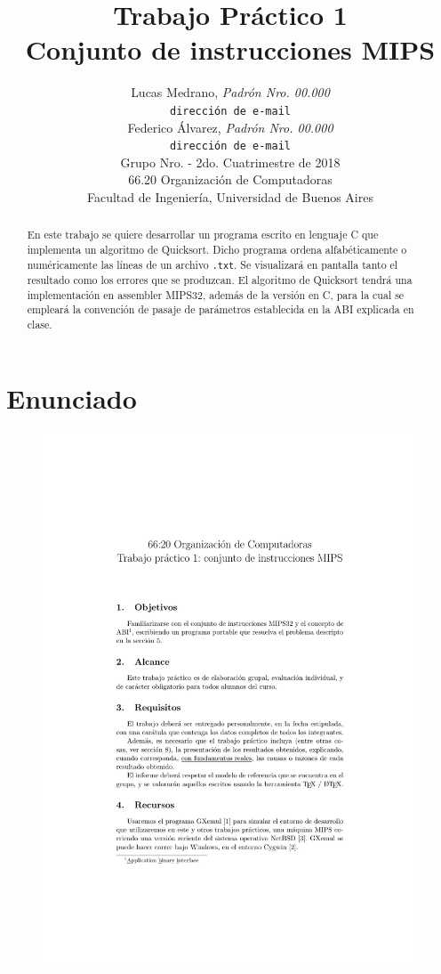 \documentclass[a4paper, 12pt]{article}
\title{		\textbf{Trabajo Práctico 1}\\
			\textbf{Conjunto de instrucciones MIPS}
			}
\author{	Lucas Medrano, \textit{Padrón Nro. 00.000}                     	\\
            \texttt{ dirección de e-mail }                           		\\
            Federico Álvarez, \textit{Padrón Nro. 00.000}                 	\\
            \texttt{ dirección de e-mail }                                 	\\[2.5ex]
            \normalsize{Grupo Nro. \quad - 2do. Cuatrimestre de 2018}      	\\
            \normalsize{66.20 Organización de Computadoras}               	\\
            \normalsize{Facultad de Ingeniería, Universidad de Buenos Aires}\\
       }
\date{}
\begin{document}
	\lstset{inputencoding=utf8/latin1} %
	\maketitle
	\thispagestyle{empty}
	\begin{abstract}
		En este trabajo se quiere desarrollar un programa escrito en lenguaje C que implementa un algoritmo de Quicksort. Dicho programa ordena alfabéticamente o numéricamente las líneas de un archivo \texttt{.txt}. Se visualizará en pantalla tanto el resultado como los errores que se produzcan. El algoritmo de Quicksort tendrá una implementación en assembler MIPS32, además de la versión en C, para la cual se empleará la convención de pasaje de parámetros establecida en la ABI explicada en clase.
	\end{abstract}
	
	\pagebreak
	\thispagestyle{empty}
	\tableofcontents
	\newpage
	
	\setcounter{page}{1}
	
	\section{Enunciado}
	\begin{figure}[H]
		\centering
		\includegraphics[scale=1, page = 1, clip, trim=20mm 36mm 20mm 35mm]{files/enunciado.pdf}
	\end{figure}
	
\end{document}
